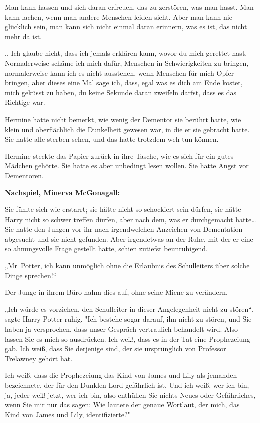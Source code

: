 {{Man kann hassen und sich daran erfreuen, das zu zerstören, was man hasst. Man kann lachen, wenn man andere Menschen leiden sieht. Aber man kann nie glücklich sein, man kann sich nicht einmal daran erinnern, was es ist, das nicht mehr da ist.

.. Ich glaube nicht, dass ich jemals erklären kann, wovor du mich gerettet hast. Normalerweise schäme ich mich dafür, Menschen in Schwierigkeiten zu bringen, normalerweise kann ich es nicht ausstehen, wenn Menschen für mich Opfer bringen, aber dieses eine Mal sage ich, dass, egal was es dich am Ende kostet, mich geküsst zu haben, du keine Sekunde daran zweifeln darfst, dass es das Richtige war.}

Hermine hatte nicht bemerkt, wie wenig der Dementor sie berührt hatte, wie klein und oberflächlich die Dunkelheit gewesen war, in die er sie gebracht hatte. Sie hatte alle sterben sehen, und das hatte trotzdem weh tun können.

Hermine steckte das Papier zurück in ihre Tasche, wie es sich für ein gutes Mädchen gehörte. Sie hatte es aber unbedingt lesen wollen. Sie hatte Angst vor Dementoren.

\textbf{Nachspiel, Minerva McGonagall:}

Sie fühlte sich wie erstarrt; sie hätte nicht so schockiert sein dürfen, sie hätte Harry nicht so schwer treffen dürfen, aber nach dem, was er durchgemacht hatte… Sie hatte den Jungen vor ihr nach irgendwelchen Anzeichen von Dementation abgesucht und sie nicht gefunden. Aber irgendetwas an der Ruhe, mit der er eine so ahnungsvolle Frage gestellt hatte, schien zutiefst beunruhigend.

„Mr~Potter, ich kann unmöglich ohne die Erlaubnis des Schulleiters über solche Dinge sprechen!“

Der Junge in ihrem Büro nahm dies auf, ohne seine Miene zu verändern.

„Ich würde es vorziehen, den Schulleiter in dieser Angelegenheit nicht zu stören“, sagte Harry Potter ruhig. "Ich bestehe sogar darauf, ihn nicht zu stören, und Sie haben ja versprochen, dass unser Gespräch vertraulich behandelt wird. Also lassen Sie es mich so ausdrücken. Ich weiß, dass es in der Tat eine Prophezeiung gab. Ich weiß, dass Sie derjenige sind, der sie ursprünglich von Professor Trelawney gehört hat.

Ich weiß, dass die Prophezeiung das Kind von James und Lily als jemanden bezeichnete, der für den Dunklen Lord gefährlich ist. Und ich weiß, wer ich bin, ja, jeder weiß jetzt, wer ich bin, also enthüllen Sie nichts Neues oder Gefährliches, wenn Sie mir nur das sagen: Wie lautete der genaue Wortlaut, der mich, das Kind von James und Lily, identifizierte?"

}
